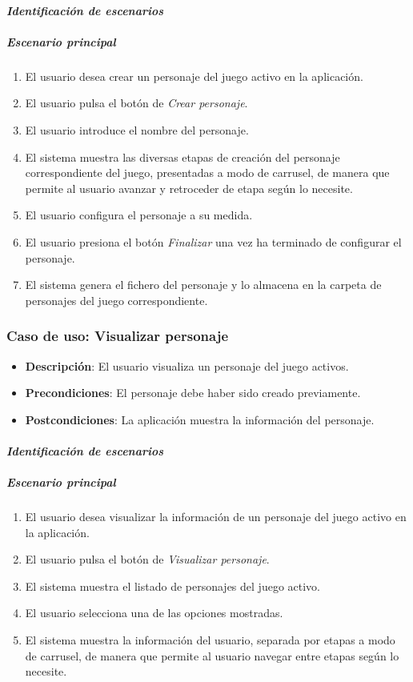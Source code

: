 \paragraph{\textit{Identificación de escenarios}}
\subparagraph{Escenario principal}
\begin{enumerate}
    \item El usuario desea crear un personaje del juego activo en la aplicación.
    \item El usuario pulsa el botón de \textit{Crear personaje}.
    \item El usuario introduce el nombre del personaje.
    \item El sistema muestra las diversas etapas de creación del personaje correspondiente del juego, presentadas 
    a modo de carrusel, de manera que permite al usuario avanzar y retroceder de etapa según lo necesite.
    \item El usuario configura el personaje a su medida.
    \item El usuario presiona el botón \textit{Finalizar} una vez ha terminado de configurar el personaje.
    \item El sistema genera el fichero del personaje y lo almacena en la carpeta de personajes del juego correspondiente.
\end{enumerate}

\subsubsection{Caso de uso: Visualizar personaje}
\begin{itemize}
    \item \textbf{Descripción}: El usuario visualiza un personaje del juego activos.
    \item \textbf{Precondiciones}: El personaje debe haber sido creado previamente.
    \item \textbf{Postcondiciones}: La aplicación muestra la información del personaje.
\end{itemize}

\paragraph{\textit{Identificación de escenarios}}
\subparagraph{Escenario principal}
\begin{enumerate}
    \item El usuario desea visualizar la información de un personaje del juego activo en la aplicación.
    \item El usuario pulsa el botón de \textit{Visualizar personaje}.
    \item El sistema muestra el listado de personajes del juego activo.
    \item El usuario selecciona una de las opciones mostradas.
    \item El sistema muestra la información del usuario, separada por etapas a modo de carrusel, de manera 
    que permite al usuario navegar entre etapas según lo necesite.
\end{enumerate}


